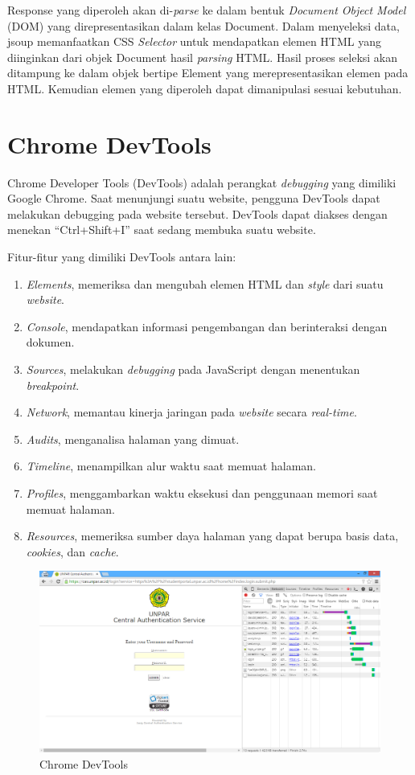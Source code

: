 Response yang diperoleh akan di-\textit{parse} ke dalam bentuk \textit{Document Object Model} (DOM) yang direpresentasikan dalam kelas Document. Dalam menyeleksi data, jsoup memanfaatkan CSS \textit{Selector} untuk mendapatkan elemen HTML yang diinginkan dari objek Document hasil \textit{parsing} HTML. Hasil proses seleksi akan ditampung ke dalam objek bertipe Element yang merepresentasikan elemen pada HTML. Kemudian elemen yang diperoleh dapat dimanipulasi sesuai kebutuhan.

\section{Chrome DevTools}
\label{sec:devtools}

Chrome Developer Tools (DevTools) \cite{devtools} adalah perangkat \textit{debugging} yang dimiliki Google Chrome. Saat menunjungi suatu website, pengguna DevTools dapat melakukan debugging pada website tersebut. DevTools dapat diakses dengan menekan "`Ctrl+Shift+I"' saat sedang membuka suatu website.  


Fitur-fitur yang dimiliki DevTools antara lain:
\begin{enumerate}
	\item \textit{Elements}, memeriksa dan mengubah elemen HTML dan \textit{style} dari suatu \textit{website}.
	\item \textit{Console}, mendapatkan informasi pengembangan dan berinteraksi dengan dokumen.
	\item \textit{Sources}, melakukan \textit{debugging} pada JavaScript dengan menentukan \textit{breakpoint}.
	\item \textit{Network}, memantau kinerja jaringan pada \textit{website} secara \textit{real-time}.
	\item \textit{Audits}, menganalisa halaman yang dimuat.
	\item \textit{Timeline}, menampilkan alur waktu saat memuat halaman.
	\item \textit{Profiles}, menggambarkan waktu eksekusi dan penggunaan memori saat memuat halaman.
	\item \textit{Resources}, memeriksa sumber daya halaman yang dapat berupa basis data, \textit{cookies}, dan \textit{cache}.
\end{enumerate}

\begin{figure}
	\centering
	\includegraphics[scale=0.5]{Gambar/chrome-devtools}
	\caption{Chrome DevTools} 
	\label{fig:chrome_devtools}
\end{figure}

